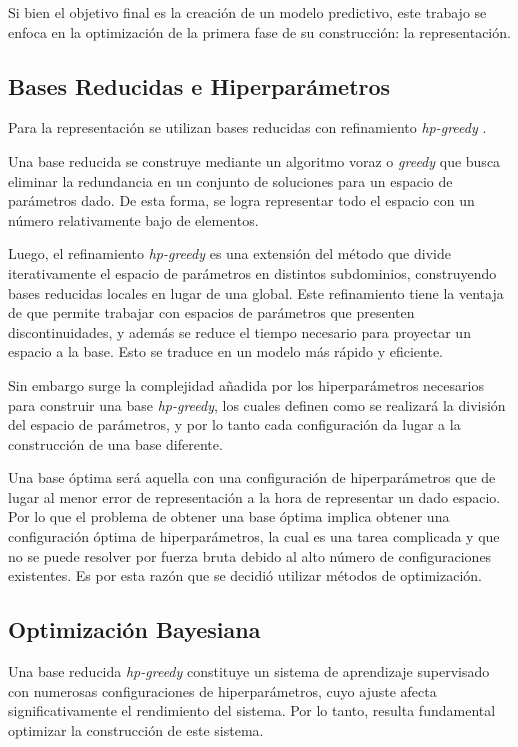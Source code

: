 Si bien el objetivo final es la creación de un modelo predictivo, este trabajo se enfoca en la optimización de la primera fase de su construcción: la representación.


\subsection*{Bases Reducidas e Hiperparámetros}

Para la representación se utilizan bases reducidas \cite{rb0book, doi:10.1137/09075250X, PhysRevLett.106.221102, 10.1115/1.1448332, rb1book} con refinamiento \textit{hp-greedy} \cite{Cerino:2022dhr}.

Una base reducida se construye mediante un algoritmo voraz o \textit{greedy} que busca eliminar la redundancia en un conjunto de soluciones para un espacio de parámetros dado. De esta forma, se logra representar todo el espacio con un número relativamente bajo de elementos. 

Luego, el refinamiento \textit{hp-greedy} es una extensión del método que divide iterativamente el espacio de parámetros en distintos subdominios, construyendo bases reducidas locales en lugar de una global. Este refinamiento tiene la ventaja de que permite trabajar con espacios de parámetros que presenten discontinuidades, y además se reduce el tiempo necesario para proyectar un espacio a la base. Esto se traduce en un modelo más rápido y eficiente.

Sin embargo surge la complejidad añadida por los hiperparámetros necesarios para construir una base \textit{hp-greedy}, los cuales definen como se realizará la división del espacio de parámetros, y por lo tanto cada configuración da lugar a la construcción de una base diferente.

Una base óptima será aquella con una configuración de hiperparámetros que de lugar al menor error de representación a la hora de representar un dado espacio. Por lo que el problema de obtener una base óptima implica obtener una configuración óptima de hiperparámetros, la cual es una tarea complicada y que no se puede resolver por fuerza bruta debido al alto número de configuraciones existentes. Es por esta razón que se decidió utilizar métodos de optimización.

\subsection*{Optimización Bayesiana}

Una base reducida \textit{hp-greedy} constituye un sistema de aprendizaje supervisado con numerosas configuraciones de hiperparámetros, cuyo ajuste afecta significativamente el rendimiento del sistema. Por lo tanto, resulta fundamental optimizar la construcción de este sistema.

